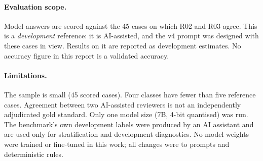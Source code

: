 \paragraph{Evaluation scope.} Model answers are scored against the 45 cases on which R02 and R03 agree. This is a \emph{development} reference: it is AI-assisted, and the v4 prompt was designed with these cases in view. Results on it are reported as development estimates. No accuracy figure in this report is a validated accuracy.

\paragraph{Limitations.} The sample is small (45 scored cases). Four classes have fewer than five reference cases. Agreement between two AI-assisted reviewers is not an independently adjudicated gold standard. Only one model size (7B, 4-bit quantised) was run. The benchmark's own development labels were produced by an AI assistant and are used only for stratification and development diagnostics. No model weights were trained or fine-tuned in this work; all changes were to prompts and deterministic rules.
